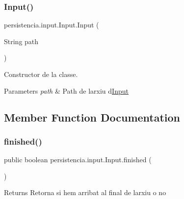 \subsubsection{\texorpdfstring{Input()}{Input()}}
{\footnotesize\ttfamily persistencia.\+input.\+Input.\+Input (\begin{DoxyParamCaption}\item[{String}]{path }\end{DoxyParamCaption})\hspace{0.3cm}{\ttfamily [inline]}}



Constructor de la classe. 


\begin{DoxyParams}{Parameters}
{\em path} & Path de l\textquotesingle{}arxiu d\textquotesingle{}\hyperlink{classpersistencia_1_1input_1_1Input}{Input} \\
\hline
\end{DoxyParams}


\subsection{Member Function Documentation}
\mbox{\label{classpersistencia_1_1input_1_1Input_af607cad1726ef15cf8e970dcbee74b68}} 
\subsubsection{\texorpdfstring{finished()}{finished()}}
{\footnotesize\ttfamily public boolean persistencia.\+input.\+Input.\+finished (\begin{DoxyParamCaption}{ }\end{DoxyParamCaption})\hspace{0.3cm}{\ttfamily [inline]}}

\begin{DoxyReturn}{Returns}
Retorna si hem arribat al final de l\textquotesingle{}arxiu o no 
\end{DoxyReturn}
\mbox{\label{classpersistencia_1_1input_1_1Input_a3fa5a378b2155a3022a4a4ef38d63a8e}} 
